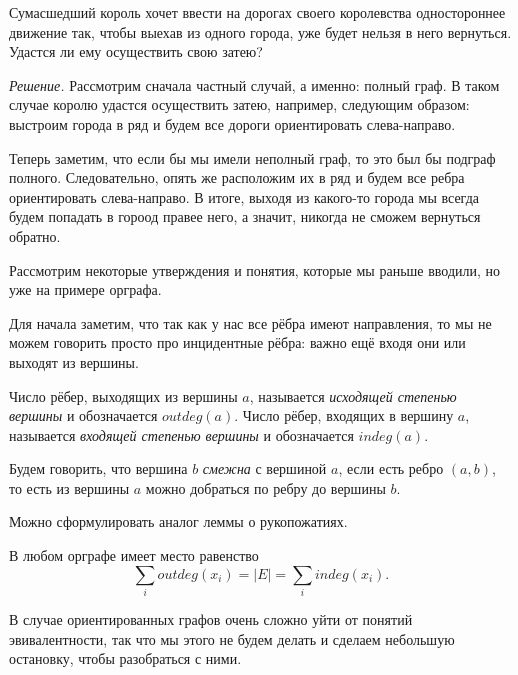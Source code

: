 \begin{example}
	Сумасшедший король хочет ввести на дорогах своего королевства одностороннее движение так, чтобы выехав 
	из одного города, уже будет нельзя в него вернуться. Удастся ли ему осуществить свою затею?
	
	\emph{Решение.} Рассмотрим сначала частный случай, а именно: полный граф. В таком случае королю удастся 
	осуществить затею, например, следующим образом: выстроим города в ряд и будем все дороги ориентировать слева-направо.
	
	Теперь заметим, что если бы мы имели неполный граф, то это был бы подграф полного. Следовательно, опять же 
	расположим их в ряд и будем все ребра ориентировать слева-направо. В итоге, выходя из какого-то города мы 
	всегда будем попадать в гороод правее него, а значит, никогда не сможем вернуться обратно.
\end{example}

	Рассмотрим некоторые утверждения и понятия, которые мы раньше вводили, но уже на примере орграфа.
	
	Для начала заметим, что так как у нас все рёбра имеют направления, то мы не можем говорить просто про 
	инцидентные рёбра: важно ещё входя они или выходят из вершины.
	
\begin{definition}
	Число рёбер, выходящих из вершины $a$, называется \emph{исходящей степенью вершины} и обозначается $outdeg (a)$. 
	Число рёбер, входящих в вершину $a$, называется \emph{входящей степенью вершины} и обозначается $indeg (a)$.
\end{definition}

\begin{definition}
	Будем говорить, что вершина $b$ \emph{смежна} с вершиной $a$, если есть ребро $(a, b)$, 
	то есть из вершины $a$ можно добраться по ребру до вершины $b$.
\end{definition}

	Можно сформулировать аналог леммы о рукопожатиях.
	
\begin{lemma}[о взятках]
	В любом орграфе имеет место равенство
	$$\sum_i outdeg (x_i) = |E| = \sum_i indeg (x_i).$$
\end{lemma}

	В случае ориентированных графов очень сложно уйти от понятий эвивалентности, так что мы этого не 
	будем делать и сделаем небольшую остановку, чтобы разобраться с ними. 
	
	
